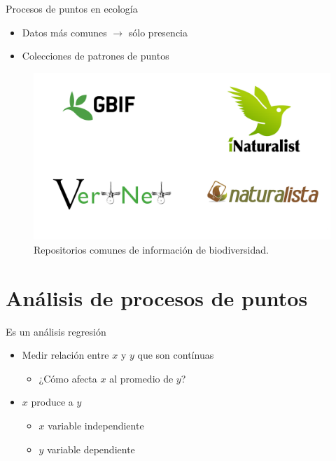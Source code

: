 \documentclass[
  11pt,
  ignorenonframetext,
]{beamer}
\providecommand{\tightlist}{%
  \setlength{\itemsep}{0pt}\setlength{\parskip}{0pt}}
\begin{document}
\begin{frame}{Procesos de puntos en ecología}
\protect\hypertarget{procesos-de-puntos-en-ecologuxeda}{}
\begin{itemize}
\item
  Datos más comunes \(\rightarrow\) sólo presencia
\item
  Colecciones de patrones de puntos
\end{itemize}

\begin{figure}
\centering
\includegraphics{Figuras/Repositorios.png}
\caption{Repositorios comunes de información de biodiversidad.}
\end{figure}
\end{frame}

\hypertarget{anuxe1lisis-de-procesos-de-puntos}{%
\section{Análisis de procesos de
puntos}\label{anuxe1lisis-de-procesos-de-puntos}}

\begin{frame}{Es un análisis regresión}
\protect\hypertarget{es-un-anuxe1lisis-regresiuxf3n}{}
\begin{itemize}
\item
  Medir relación entre \(x\) y \(y\) que son contínuas

  \begin{itemize}
  \tightlist
  \item
    ¿Cómo afecta \(x\) al promedio de \(y\)?
  \end{itemize}
\item
  \(x\) produce a \(y\)

  \begin{itemize}
  \tightlist
  \item
    \(x\) variable independiente
  \item
    \(y\) variable dependiente
  \end{itemize}
\end{itemize}
\end{frame}
\end{document}
